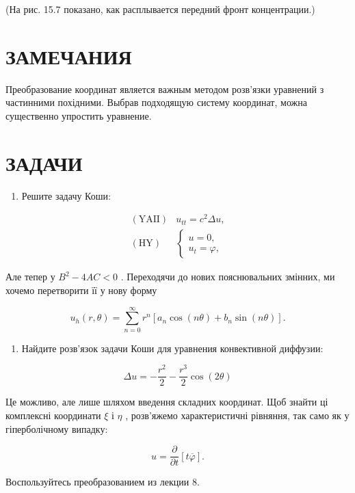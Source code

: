 \documentclass[
  ukrainian,
]{article}
\providecommand{\tightlist}{%
  \setlength{\itemsep}{0pt}\setlength{\parskip}{0pt}}
\begin{document}
(На рис. 15.7 показано, как расплывается передний фронт концентрации.)

\section{ЗАМЕЧАНИЯ}\label{ux437ux430ux43cux435ux447ux430ux43dux438ux44f-1}

Преобразование координат является важным методом розв'язки уравнений з
частинними похідними. Выбрав подходящую систему координат, можна
существенно упростить уравнение.

\section{ЗАДАЧИ}\label{ux437ux430ux434ux430ux447ux438}

\begin{enumerate}
\def\labelenumi{\arabic{enumi}.}
\tightlist
\item
  Решите задачу Коши:
\end{enumerate}

\[
\begin{aligned} (\text{YAII}) & u_{tt} = c^2 \Delta u, \\ (\text{HY}) & \begin{cases} u = 0, \\ u_t = \varphi, \end{cases} \end{aligned}
\]

Але тепер у \(B^2-4AC<0\) . Переходячи до нових пояснювальних змінних,
ми хочемо перетворити її у нову форму

\[
u_h(r, \theta) = \sum_{n=0}^{\infty} r^n [a_n \cos(n\theta) + b_n \sin(n\theta)].
\]

\begin{enumerate}
\def\labelenumi{\arabic{enumi}.}
\setcounter{enumi}{1}
\tightlist
\item
  Найдите розв'язок задачи Коши для уравнения конвективной диффузии:
\end{enumerate}

\[
\Delta u = -\frac{r^2}{2} - \frac{r^3}{2} \cos{(2\theta)}
\]

Це можливо, але лише шляхом введення складних координат. Щоб знайти ці
комплексні координати \(\xi\) і \(\eta\) , розв'яжемо характеристичні
рівняння, так само як у гіперболічному випадку:

\[
u = \frac{\partial}{\partial t} [t\overline{\varphi}].
\]

Воспользуйтесь преобразованием из лекции 8.
\end{document}
